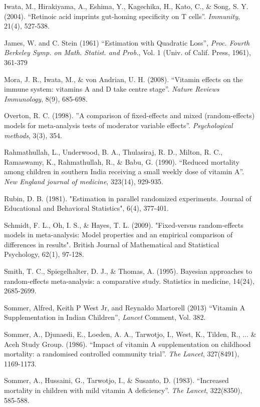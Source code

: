 \documentclass[12pt]{article}
\begin{document}
\begin{thebibliography}{99}
 Iwata, M., Hirakiyama, A., Eshima, Y., Kagechika, H., Kato, C., \& Song, S. Y. (2004). ``Retinoic acid imprints gut-homing specificity on T cells''. \emph{Immunity}, 21(4), 527-538.

 James, W. and C. Stein (1961) ``Estimation with Quadratic Loss'', \emph{Proc. Fourth Berkeley Symp. on Math. Statist. and Prob.}, Vol. 1 (Univ. of Calif. Press, 1961), 361-379

 Mora, J. R., Iwata, M., \& von Andrian, U. H. (2008). ``Vitamin effects on the immune system: vitamins A and D take centre stage''. \emph{Nature Reviews Immunology}, 8(9), 685-698.

 Overton, R. C. (1998). ''A comparison of fixed-effects and mixed (random-effects) models for meta-analysis tests of moderator variable effects''. \emph{Psychological methods}, 3(3), 354.

 Rahmathullah, L., Underwood, B. A., Thulasiraj, R. D., Milton, R. C., Ramaswamy, K., Rahmathullah, R., \& Babu, G. (1990). ``Reduced mortality among children in southern India receiving a small weekly dose of vitamin A''. \emph{New England journal of medicine}, 323(14), 929-935.

 Rubin, D. B. (1981). "Estimation in parallel randomized experiments. Journal of Educational and Behavioral Statistics", 6(4), 377-401.

 Schmidt, F. L., Oh, I. S., \& Hayes, T. L. (2009). "Fixed-versus random-effects models in meta-analysis: Model properties and an empirical comparison of differences in results". British Journal of Mathematical and Statistical Psychology, 62(1), 97-128.

 Smith, T. C., Spiegelhalter, D. J., \& Thomas, A. (1995). Bayesian approaches to random-effects meta-analysis: a comparative study. Statistics in medicine, 14(24), 2685-2699.

 Sommer, Alfred, Keith P West Jr, and Reynaldo Martorell (2013) ``Vitamin A Supplementation in Indian Children'', \emph{Lancet} Comment, Vol. 382.

 Sommer, A., Djunaedi, E., Loeden, A. A., Tarwotjo, I., West, K., Tilden, R., ... \& Aceh Study Group. (1986). ``Impact of vitamin A supplementation on childhood mortality: a randomised controlled community trial''. \emph{The Lancet}, 327(8491), 1169-1173.

 Sommer, A., Hussaini, G., Tarwotjo, I., \& Susanto, D. (1983). ``Increased mortality in children with mild vitamin A deficiency''. \emph{The Lancet}, 322(8350), 585-588.


\end{thebibliography}
\end{document}
